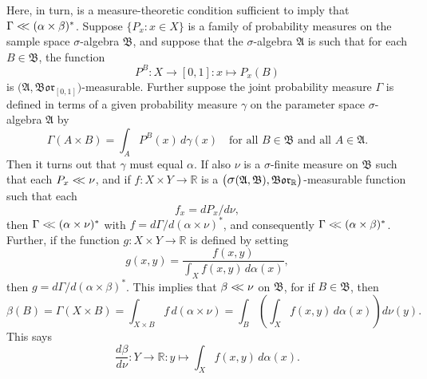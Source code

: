 \documentclass[
twoside=true,
paper=letter,
fontsize=9pt,
pagesize=auto,
leqno,
openany,
headsepline,
overfullrule,
]{scrbook}
\theoremstyle{plain}
\theoremstyle{plain}
\theoremstyle{definition}
\theoremstyle{bfnoteitalic}
\theoremstyle{bfnoteroman}
\newcommand{\sigalg}[1]{\mathfrak{#1}}
\newcommand{\borel}{\mathfrak{Bor}}
\newcommand{\sagb}{\mathop{\hbox{\large{$\sigma$}}}\nolimits}
\newcommand{\textsigma}{\hbox{\large{$\sigma$}}\kern-1pt}
\newcommand{\R}{\mathbb{R}}
\newcommand{\productsig}[2]{\sagb(#1,#2)}
\newcommand{\funcf}{f}
\newcommand{\funcg}{g}
\newcommand{\function}{f}
\newcommand{\functionii}{g}
\newcommand{\measurespace}{X}
\newcommand{\measurespaceii}{Y}
\newcommand{\abscont}{\mathrel{< \kern-3.5pt <}}
\newcommand{\measnu}{\nu}
\newcommand{\pspace}{\measurespace}%
\newcommand{\sspace}{\measurespaceii}%
\newcommand{\pspaceset}{A}
\newcommand{\sspaceset}{B}
\newcommand{\pspaceelt}{x}
\newcommand{\sspaceelt}{y}
\newcommand{\sspacesig}{\sigalg{B}}
\newcommand{\pspacesig}{\sigalg{A}}
\newcommand{\joint}{\Gamma}%
\newcommand{\measonprod}{\Gamma}%
\newcommand{\marginalone}{\alpha}%
\newcommand{\marginaltwo}{\beta}%
\newcommand{\prior}{\marginalone}
\newcommand{\predictive}{\marginaltwo}
\newcommand{\wouldbeprior}{\gamma}
\begin{document}
Here, in turn, is a measure-theoretic condition sufficient to imply that
$\measonprod\abscont (\prior\times\predictive)^*$.
Suppose
$\{ P_\pspaceelt :\pspaceelt\in\pspace \}$
is a family of probability measures on the sample space \textsigma-algebra
$\sspacesig$,
and suppose that the \textsigma\hyp{}algebra $\pspacesig$ is such that for each
$\sspaceset\in\sspacesig$, the function
\[
P^\sspaceset
:\pspace \to [0,1]
:\pspaceelt \mapsto P_\pspaceelt(\sspaceset)
\]
is $\bigl(\pspacesig,\borel_{[0,1]}\bigr)$\hyp{}measurable.
Further suppose the joint probability measure $\joint$  is defined in terms of
a given probability measure $\wouldbeprior$ on the parameter space \textsigma-algebra
$\pspacesig$ by
\[
\measonprod(\pspaceset\times\sspaceset)
=
\int_\pspaceset P^\sspaceset(\pspaceelt)
\, d\wouldbeprior(\pspaceelt)
\quad
\text{for all $\sspaceset\in\sspacesig$ and all $\pspaceset \in \pspacesig$.}
\]
Then it turns out that $\wouldbeprior$ must equal $\prior$.
If also $\measnu$ is a \textsigma-finite measure on $\sspacesig$
such that each
$P_\pspaceelt\abscont \measnu$, and if
$\funcf : \pspace\times\sspace\to\R$ is a
$\bigl(\productsig{\pspacesig}{\sspacesig},\borel_\R\bigr)$\hyp{}measurable function
such that each
\begin{equation}\label{as_density}
\function_\pspaceelt
=
d P_\pspaceelt/d\measnu,
\end{equation}
then
$\joint \abscont (\prior \times\measnu)^*$
with
$\function
=
d\measonprod/d(\prior \times\measnu)^*$,
and consequently
$\measonprod\abscont (\prior\times\predictive)^*$.
Further, if the function
$\funcg: \pspace\times\sspace\to\R$ is defined by setting
\[\functionii(\pspaceelt,\sspaceelt)
=
\frac
{\function(\pspaceelt,\sspaceelt)}
{\int_\pspace \function(\pspaceelt,\sspaceelt)\,
d\prior(\pspaceelt)},
\]
then
$\functionii
=
d\measonprod/d(\prior\times\predictive)^*$.
This implies that $\predictive \abscont \measnu$ on $\sspacesig$, for if $\sspaceset\in\sspacesig$, then
\[
\predictive(\sspaceset)
= \measonprod(\pspace \times \sspaceset) 
= \int_{\pspace \times \sspaceset} \function \, d(\prior\times\measnu)
= \int_\sspaceset\left( \int_\pspace \function(\pspaceelt, \sspaceelt)\,d\prior(x)\right) d\measnu(\sspaceelt).
\]
This says 
\[
\frac{d\predictive}{d\measnu}:
\sspace\to\R:
\sspaceelt\mapsto \int_\pspace \function(\pspaceelt,\sspaceelt)\,d\prior(x).
\]
\end{document}
